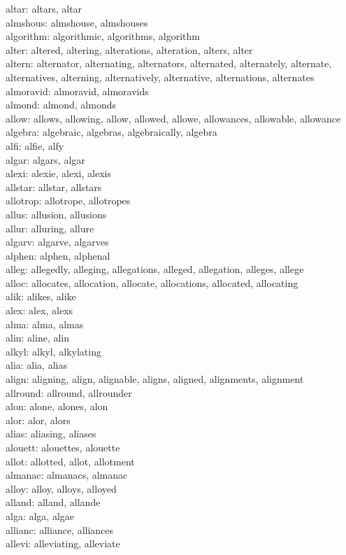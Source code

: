 \documentclass[10pt,letterpaper,bibliography=totoc]{scrartcl}
\begin{document}
altar: altars, altar\\
almshous: almshouse, almshouses\\
algorithm: algorithmic, algorithms, algorithm\\
alter: altered, altering, alterations, alteration, alters, alter\\
altern: alternator, alternating, alternators, alternated, alternately, alternate, alternatives, alterning, alternatively, alternative, alternations, alternates\\
almoravid: almoravid, almoravids\\
almond: almond, almonds\\
allow: allows, allowing, allow, allowed, allowe, allowances, allowable, allowance\\
algebra: algebraic, algebras, algebraically, algebra\\
alfi: alfie, alfy\\
algar: algars, algar\\
alexi: alexie, alexi, alexis\\
allstar: allstar, allstars\\
allotrop: allotrope, allotropes\\
allus: allusion, allusions\\
allur: alluring, allure\\
algarv: algarve, algarves\\
alphen: alphen, alphenal\\
alleg: allegedly, alleging, allegations, alleged, allegation, alleges, allege\\
alloc: allocates, allocation, allocate, allocations, allocated, allocating\\
alik: alikes, alike\\
alex: alex, alexs\\
alma: alma, almas\\
alin: aline, alin\\
alkyl: alkyl, alkylating\\
alia: alia, alias\\
align: aligning, align, alignable, aligns, aligned, alignments, alignment\\
allround: allround, allrounder\\
alon: alone, alones, alon\\
alor: alor, alors\\
alias: aliasing, aliases\\
alouett: alouettes, alouette\\
allot: allotted, allot, allotment\\
almanac: almanacs, almanac\\
alloy: alloy, alloys, alloyed\\
alland: alland, allande\\
alga: alga, algae\\
allianc: alliance, alliances\\
allevi: alleviating, alleviate\\
\end{document}
